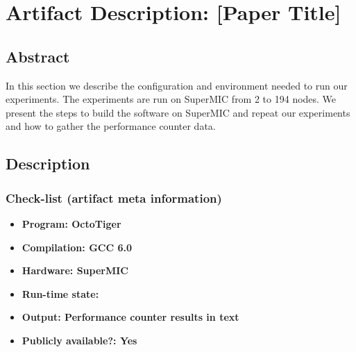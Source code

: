 \section{Artifact Description: [Paper Title]}


\subsection{Abstract}

In this section we describe the configuration and environment needed to run our experiments. The experiments are run on SuperMIC\cite{smic_info} from 2 to 194 nodes. We present the steps to build the software on SuperMIC and repeat our experiments and how to gather the performance counter data.

\subsection{Description}

\subsubsection{Check-list (artifact meta information)}


{\small
\begin{itemize}
  \item {\bf Program: OctoTiger}
  \item {\bf Compilation: GCC 6.0}
  \item {\bf Hardware: SuperMIC}
  \item {\bf Run-time state: }
  \item {\bf Output: Performance counter results in text}
  \item {\bf Publicly available?: Yes}
\end{itemize}
}

